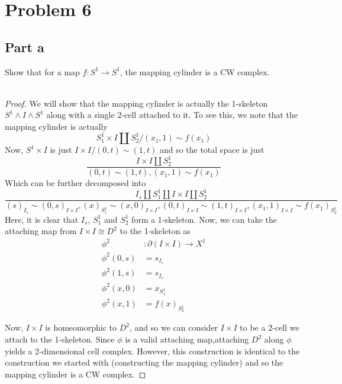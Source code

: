 \documentclass[fontsize=11pt]{scrartcl} %
\numberwithin{equation}{section} %
\numberwithin{figure}{section} %
\numberwithin{table}{section} %
\begin{document}
\newpage

\section*{Problem 6}
\subsection*{Part a}
Show that for a map $f:S^1\to S^1$, the mapping cylinder is a CW complex.
\\
\\
\begin{proof}
    We will show that the mapping cylinder is actually the 1-skeleton $S^1\wedge
    I\wedge S^1$ along with a single $2$-cell attached to it. To see this, we
    note that the mapping cylinder is actually
    \[
        S^1_1\times I \coprod S^1_2/{(x_1,1)\sim f(x_1)}
    \]
    Now, $S^1\times I$ is just $I\times I/{(0,t)\sim (1,t)}$ and so the total
    space is just
    \[
        \frac{I\times I \coprod S^1_2}{(0,t)\sim (1,t), (x_1,1)\sim f(x_1)}
    \]
    Which can be further decomposed into
    \[
        \frac{I_s\coprod S^1_1\coprod I\times I\coprod S^1_2}
        {(s)_{I_s}\sim(0,s)_{I\times I}, (x)_{S^1_1}\sim (x,0)_{I\times I},
        (0,t)_{I\times I}\sim (1,t)_{I\times I}, (x_1,1)_{I\times I}\sim
        f(x_1)_{S^1_2}}
    \]
    Here, it is clear that $I_s$, $S^1_1$ and $S^1_2$ form a 1-skeleton. Now, we
    can take the attaching map from $I\times I\cong D^2$ to the 1-skeleton as
    \[
        \begin{aligned}
            \phi^2&:\partial(I\times I)\to X^1\\
            \phi^2(0,s) &= s_{I_s}\\
            \phi^2(1,s) &= s_{I_s}\\
            \phi^2(x,0) &= x_{S^1_1}\\
            \phi^2(x,1) &= f(x)_{S^1_2}
        \end{aligned}
    \]

    Now, $I\times I$ is homeomorphic to $D^2$, and so we can consider $I\times
    I$ to be a 2-cell we attach to the 1-skeleton. Since $\phi$ is a valid
    attaching map,attaching $D^2$ along $\phi$ yields a 2-dimensional cell
    complex. However, this construction is identical to the construction we
    started with (constructing the mapping cylinder) and so the mapping cylinder
    is a CW complex.
\end{proof}
\end{document}
